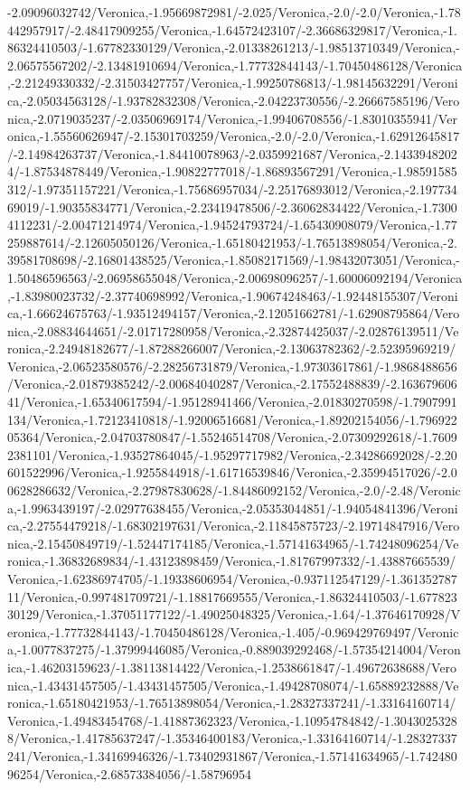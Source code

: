 {\begin{tikzternal}
-2.09096032742/Veronica,-1.95669872981/-2.025/Veronica,-2.0/-2.0/Veronica,-1.78442957917/-2.48417909255/Veronica,-1.64572423107/-2.36686329817/Veronica,-1.86324410503/-1.67782330129/Veronica,-2.01338261213/-1.98513710349/Veronica,-2.06575567202/-2.13481910694/Veronica,-1.77732844143/-1.70450486128/Veronica,-2.21249330332/-2.31503427757/Veronica,-1.99250786813/-1.98145632291/Veronica,-2.05034563128/-1.93782832308/Veronica,-2.04223730556/-2.26667585196/Veronica,-2.0719035237/-2.03506969174/Veronica,-1.99406708556/-1.83010355941/Veronica,-1.55560626947/-2.15301703259/Veronica,-2.0/-2.0/Veronica,-1.62912645817/-2.14984263737/Veronica,-1.84410078963/-2.0359921687/Veronica,-2.14339482024/-1.87534878449/Veronica,-1.90822777018/-1.86893567291/Veronica,-1.98591585312/-1.97351157221/Veronica,-1.75686957034/-2.25176893012/Veronica,-2.19773469019/-1.90355834771/Veronica,-2.23419478506/-2.36062834422/Veronica,-1.73004112231/-2.00471214974/Veronica,-1.94524793724/-1.65430908079/Veronica,-1.77259887614/-2.12605050126/Veronica,-1.65180421953/-1.76513898054/Veronica,-2.39581708698/-2.16801438525/Veronica,-1.85082171569/-1.98432073051/Veronica,-1.50486596563/-2.06958655048/Veronica,-2.00698096257/-1.60006092194/Veronica,-1.83980023732/-2.37740698992/Veronica,-1.90674248463/-1.92448155307/Veronica,-1.66624675763/-1.93512494157/Veronica,-2.12051662781/-1.62908795864/Veronica,-2.08834644651/-2.01717280958/Veronica,-2.32874425037/-2.02876139511/Veronica,-2.24948182677/-1.87288266007/Veronica,-2.13063782362/-2.52395969219/Veronica,-2.06523580576/-2.28256731879/Veronica,-1.97303617861/-1.9868488656/Veronica,-2.01879385242/-2.00684040287/Veronica,-2.17552488839/-2.16367960641/Veronica,-1.65340617594/-1.95128941466/Veronica,-2.01830270598/-1.7907991134/Veronica,-1.72123410818/-1.92006516681/Veronica,-1.89202154056/-1.79692205364/Veronica,-2.04703780847/-1.55246514708/Veronica,-2.07309292618/-1.76092381101/Veronica,-1.93527864045/-1.95297717982/Veronica,-2.34286692028/-2.20601522996/Veronica,-1.9255844918/-1.61716539846/Veronica,-2.35994517026/-2.00628286632/Veronica,-2.27987830628/-1.84486092152/Veronica,-2.0/-2.48/Veronica,-1.9963439197/-2.02977638455/Veronica,-2.05353044851/-1.94054841396/Veronica,-2.27554479218/-1.68302197631/Veronica,-2.11845875723/-2.19714847916/Veronica,-2.15450849719/-1.52447174185/Veronica,-1.57141634965/-1.74248096254/Veronica,-1.36832689834/-1.43123898459/Veronica,-1.81767997332/-1.43887665539/Veronica,-1.62386974705/-1.19338606954/Veronica,-0.937112547129/-1.36135278711/Veronica,-0.997481709721/-1.18817669555/Veronica,-1.86324410503/-1.67782330129/Veronica,-1.37051177122/-1.49025048325/Veronica,-1.64/-1.37646170928/Veronica,-1.77732844143/-1.70450486128/Veronica,-1.405/-0.969429769497/Veronica,-1.0077837275/-1.37999446085/Veronica,-0.889039292468/-1.57354214004/Veronica,-1.46203159623/-1.38113814422/Veronica,-1.2538661847/-1.49672638688/Veronica,-1.43431457505/-1.43431457505/Veronica,-1.49428708074/-1.65889232888/Veronica,-1.65180421953/-1.76513898054/Veronica,-1.28327337241/-1.33164160714/Veronica,-1.49483454768/-1.41887362323/Veronica,-1.10954784842/-1.30430253288/Veronica,-1.41785637247/-1.35346400183/Veronica,-1.33164160714/-1.28327337241/Veronica,-1.34169946326/-1.73402931867/Veronica,-1.57141634965/-1.74248096254/Veronica,-2.68573384056/-1.58796954
\end{tikzternal}}
